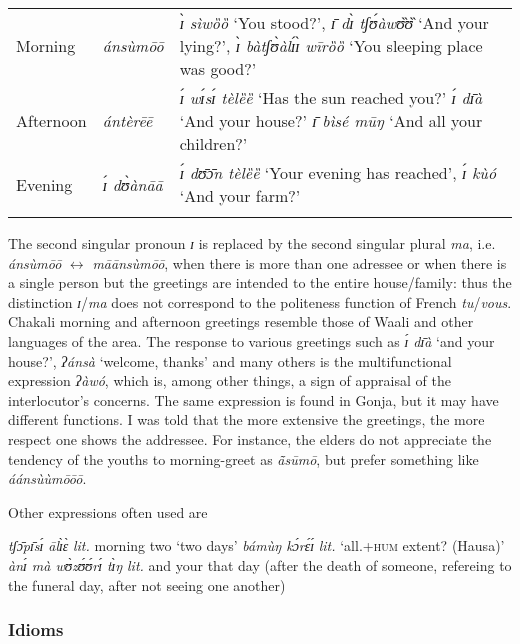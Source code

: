 \begin{exe}
\begin{exe}
\begin{exe}
{\begin{exe}
\begin{exe}
\begin{exe}
\begin{exe}
\begin{exe}
\begin{exe}
\begin{exe}
\begin{xlist}
\begin{exe}
\begin{exe}
\begin{exe}
\begin{exe}
\begin{exe}
\begin{exe}
\begin{exe}
\begin{exe}
\begin{exe}
\begin{exe}
\begin{exe}
\begin{exe}
\begin{exe}
\begin{exe}
\begin{exe}
\begin{table}[!htb]
\begin{tabular}{l>{\itshape}lp{7cm}}
Morning  & ánsùmōō  & \textit{ɪ̀ sìwȍȍ} `You stood?', \textit{ɪ̄ dɪ̀ 
tʃʊ́àwʊ̏ʊ̏}   `And your lying?', \textit{ɪ̀ bàtʃʊ̀àlɪ́ɪ̀ wīrȍȍ }  `You 
sleeping place was good?' \\[1ex]

Afternoon   & ántèrēē & \textit{ɪ́ wɪ́sɪ́ tèlȅȅ}   `Has the sun reached 
you?' \textit{ ɪ́ dɪ̄à} `And your house?'  \textit{ɪ̄ bìsé mūŋ} `And all 
your children?'\\[1ex]
  

Evening & ɪ́ dʊ̀ànāā &  \textit{ ɪ́  dʊ̄ɔ̄n tèlȅȅ}  `Your evening 
has reached', 
\textit{ɪ́ kùó} `And your farm?'\\
\lspbottomrule
\end{tabular} 
\end{table}



The second singular pronoun {\it ɪ} is replaced by the  second singular plural 
{\it ma}, i.e.  {\it ánsùmōō} $\leftrightarrow$ {\it māānsùmōō},
when there is more than one adressee or when there is  a single person but the
greetings
are intended to the entire house/family: thus  the distinction {\it ɪ}/{\it ma}
does
not correspond to the politeness function of French {\it tu}/{\it vous}. Chakali
 morning and afternoon greetings resemble those of Waali and other languages of
the area.
The response to various greetings such as {\it ɪ́ dɪ̄à} `and your house?',  
{\it ʔánsà} `welcome, thanks' and many others is the multifunctional 
expression {\it ʔàwó},  which is, among other things, a sign of appraisal of 
the
interlocutor's
concerns. The same expression is found in Gonja, but it may have different
functions. I was told that the more extensive the greetings, the more
respect one shows the addressee.  For instance, the elders do not
appreciate the tendency of
the youths to morning-greet as {\it ã̄sūmō}, but prefer something like {\it 
áánsùùmōōō}. 

Other expressions often used are

{\it tʃɔ̄pɪ̄sɪ́ ālɪ̀ɛ̀}  {\it lit.} morning two `two days'
{\it bámùŋ kɔ́rɛ́ɪ́}  {\it lit.}  `all.\textsc{+hum} extent? (Hausa)'
{\it ànɪ́ mà wʊ̀zʊ́ʊ́rɪ́ tɪ̀ŋ} {\it lit.} and your that day (after the death 
of someone, refereing to the funeral day, after not seeing one another)
 

\subsubsection{Idioms}
\label{sec:GRM-idiom}


\end{exe}
\end{exe}
\end{exe}
\end{exe}
\end{exe}
\end{exe}
\end{exe}
\end{exe}
\end{exe}
\end{exe}
\end{exe}
\end{exe}
\end{exe}
\end{exe}
\end{exe}
\end{xlist}
\end{exe}
\end{exe}
\end{exe}
\end{exe}
\end{exe}
\end{exe}
\end{exe}}
\end{exe}
\end{exe}
\end{exe}
